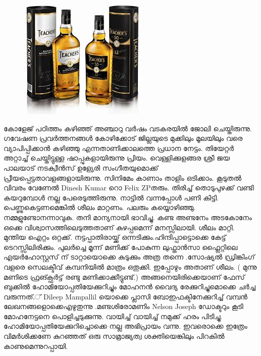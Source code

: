 \documentclass[10pt,a4paper]{report}
\begin{document}
  \begin{figure}[H]
  \center
\includegraphics[scale=.45]{images/whisky}
\label{whisky}
\caption{   }
\end{figure}
  കോളേജ് പഠിത്തം കഴിഞ്ഞ് അഞ്ചാറു വർഷം വടകരയിൽ ജോലി ചെയ്തിരുന്നു. ഗവേഷണ പ്രവർത്തനങ്ങൾ കോഴിക്കോട് ജില്ലയുടെ മുക്കിലും മൂലയിലും വരെ വ്യാപിപ്പിക്കാൻ കഴിഞ്ഞു എന്നതാണിക്കാലത്തെ പ്രധാന നേട്ടം. തിയേറ്റർ അറ്റാച്ച് ചെയ്തിട്ടുള്ള ഷാപ്പുകളായിരുന്നു പ്രിയം. വെള്ളിക്കുളങ്ങര ശ്രീ ജയ പാലയാട് നടക്വീൻസ് ഉള്യേരി സംഗീതയുമൊക്ക് പ്രീയപ്പെട്ടതാവളങ്ങളായിരുന്നു. സിനിമേം കാണാം താളിം ഒടിക്കാം. കൂടുതൽ വിവരം വേണേൽ Dinesh Kumar റൊ Felix ZPതരും. തിരിച്ച് തൊടുപുഴക്ക് വണ്ടി കയറുമ്പോൾ നല്ല പേരെടുത്തിരുന്നു. നാട്ടിൽ വന്നപ്പോൾ പണി കിട്ടി. പെണ്ണുകെട്ടണമെങ്കിൽ ശീലം മാറ്റണം. പലരും കയ്യൊഴിഞ്ഞു. നമ്മളുണ്ടോനന്നാവുക. തനി മാന്യനായി ഭാവിച്ചു. കണ്ട അണ്ടനേം അടകോനേം ഒക്കെ വിശ്വാസത്തിലെടുത്തതാണ് കുഴപ്പമെന്ന് മനസ്സിലായി. ശീലം മാറ്റി. മുന്തിയ ഐറ്റം ഒറ്റക്ക്. നട്ടപ്പാതിരായ്ക്ക് ഒന്നടിക്കും.ഹിന്ദിപ്പാട്ടൊക്കെ കേട്ട് ടെറസ്സിലിരിക്കും. പുലർച്ചെ മൂന്ന് മണിക്ക് പോകുന്ന ലുഫ്താൻസാ ഫ്ലൈറ്റിലെ എയർഹോസ്റ്റസ് ന് ടാറ്റായൊക്കെ കുടുക്കും അത്ര തന്നെ .സോഷ്യൽ ഡ്രിങ്കിംഗ് വളരെ സെലക്ടീവ് കമ്പനിയിൽ മാത്രം ഒതുക്കി. ഇപ്പോഴും അതാണ് ശീലം. ( മുന്നു മണിടെ ഫ്രങ്ക്ഫർട്ട് രണ്ടു മണിക്കാക്കീട്ടുണ്ട്.) അങ്ങനെയിരിക്കെയാണ് ഫേസ് ബുക്കിൽ ഹോമിയോപ്പതിയേക്കുറിച്ചും മോഹനൻ വൈദ്യ രേക്കുറിച്ചുമൊക്കെ ചർച്ച വരുന്നത്.് Dileep Mampallil യൊക്കെ പ്ലാസി ബോഇഫക്ടിനേക്കുറിച്ച് വമ്പൻ ലേഖനങ്ങളൊക്കെഎഴുതുന്നു .മണ്ടശിരോമണിം Nelson Joseph ഡോക്ടറും കൂടി മോഹനേട്ടനെ പൊളിച്ചടുക്കുന്നു. വായിച്ച് വായിച്ച് നമുക്ക് ഹരം പിടിച്ചു. ഹോമിയോപ്പതിയേക്കുറിച്ചൊക്കെ നല്ല അഭിപ്രായം വന്നു. ഇവരൊക്കെ ഇത്രേം വിമർശിക്കണേ കുറഞ്ഞത് ഒരു സാമ്രാജ്യത്വ ശക്തിയെങ്കിലും പിറകിൽ കാണുമെന്നുറപ്പായി. 
  
\end{document}
